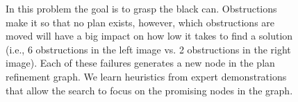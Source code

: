 \begin{figure}[t]
  \caption{\small{In this problem the goal is to grasp the black
      can. Obstructions make it so that no plan exists, however, which
      obstructions are moved will have a big impact on how low it
      takes to find a solution (i.e., 6 obstructions in the left image
      vs. 2 obstructions in the right image). Each of these failures
      generates a new node in the plan refinement graph. We learn
      heuristics from expert demonstrations that allow the search to
      focus on the promising nodes in the graph.}}
  \label{fig:hlsearch}
\end{figure}

